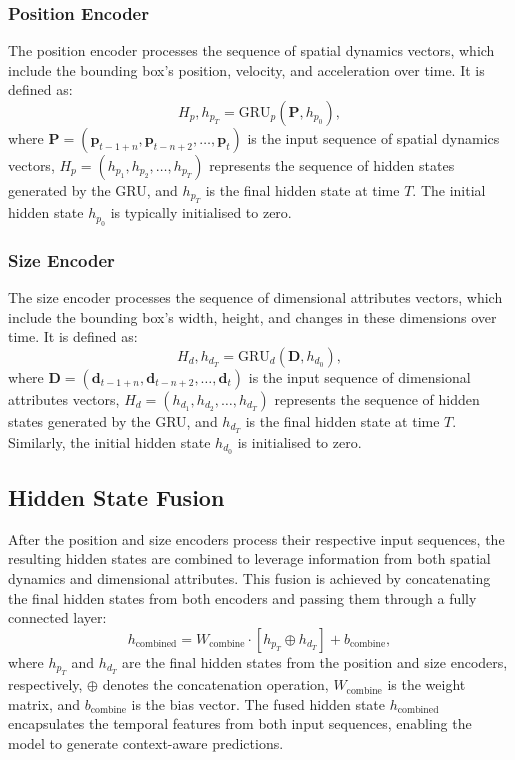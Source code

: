 \documentclass[12pt,oneside]{book} %
\begin{document}
\subsubsection*{Position Encoder}
\noindent The position encoder processes the sequence of spatial dynamics vectors, which include the bounding box’s position, velocity, and acceleration over time. It is defined as:
\begin{equation}
    H_p, h_{p_T} = \text{GRU}_p(\mathbf{P}, h_{p_0}),
\end{equation}
where $\mathbf{P} = (\mathbf{p}_{t-1+n}, \mathbf{p}_{t-n+2}, \ldots, \mathbf{p}_t)$ is the input sequence of spatial dynamics vectors, $H_p = (h_{p_1}, h_{p_2}, \ldots, h_{p_T})$ represents the sequence of hidden states generated by the GRU, and $h_{p_T}$ is the final hidden state at time $T$. The initial hidden state $h_{p_0}$ is typically initialised to zero.

\subsubsection*{Size Encoder}
\noindent The size encoder processes the sequence of dimensional attributes vectors, which include the bounding box’s width, height, and changes in these dimensions over time. It is defined as:
\begin{equation}
    H_d, h_{d_T} = \text{GRU}_d(\mathbf{D}, h_{d_0}),
\end{equation}
where $\mathbf{D} = (\mathbf{d}_{t-1+n}, \mathbf{d}_{t-n+2}, \ldots, \mathbf{d}_t)$ is the input sequence of dimensional attributes vectors, $H_d = (h_{d_1}, h_{d_2}, \ldots, h_{d_T})$ represents the sequence of hidden states generated by the GRU, and $h_{d_T}$ is the final hidden state at time $T$. Similarly, the initial hidden state $h_{d_0}$ is initialised to zero.

\subsection{Hidden State Fusion}
\noindent After the position and size encoders process their respective input sequences,
the resulting hidden states are combined to leverage information from both
spatial dynamics and dimensional attributes. This fusion is achieved by
concatenating the final hidden states from both encoders and passing them
through a fully connected layer:
\begin{equation}
    h_{\text{combined}} = W_{\text{combine}} \cdot \left[h_{p_T} \oplus h_{d_T}\right] + b_{\text{combine}},
\end{equation}
where $h_{p_T}$ and $h_{d_T}$ are the final hidden states from the position and size encoders, respectively, $\oplus$ denotes the concatenation operation, $W_{\text{combine}}$ is the weight matrix, and $b_{\text{combine}}$ is the bias vector. The fused hidden state $h_{\text{combined}}$ encapsulates the temporal features from both input sequences, enabling the model to generate context-aware predictions.
\end{document}
